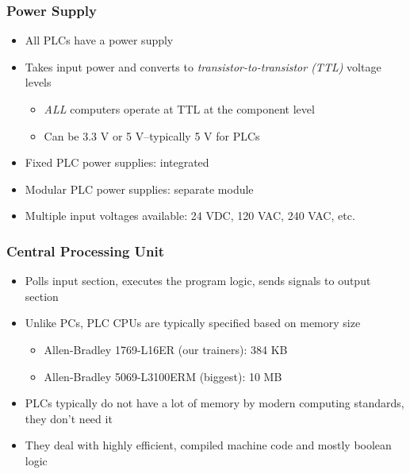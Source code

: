 \begin{frame}
    \frametitle{Power Supply}

    \begin{itemize}
        \item All PLCs have a power supply
        \item Takes input power and converts to \emph{transistor-to-transistor (TTL)} voltage levels
        \begin{itemize}
            \item \emph{ALL} computers operate at TTL at the component level
            \item Can be 3.3 V or 5 V--typically 5 V for PLCs
        \end{itemize}
        \item Fixed PLC power supplies: integrated
        \item Modular PLC power supplies: separate module
        \item Multiple input voltages available: 24 VDC, 120 VAC, 240 VAC, etc.
    \end{itemize}
\end{frame}

\begin{frame}
    \frametitle{Central Processing Unit}

    \begin{itemize}
        \item Polls input section, executes the program logic, sends signals to output section
        \item Unlike PCs, PLC CPUs are typically specified based on memory size
        \begin{itemize}
            \item Allen-Bradley 1769-L16ER (our trainers): 384 KB
            \item Allen-Bradley 5069-L3100ERM (biggest): 10 MB
        \end{itemize}
        \item PLCs typically do not have a lot of memory by modern computing standards, they don't need it
        \item They deal with highly efficient, compiled machine code and mostly boolean logic
    \end{itemize}
\end{frame}

